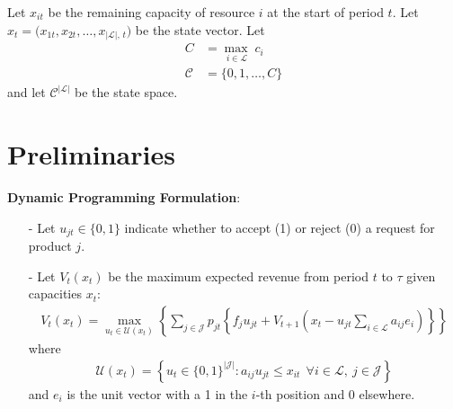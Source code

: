 \documentclass[11pt]{article}
\begin{document}
\noindent
Let $x_{it}$ be the remaining capacity of resource $i$ at the start of period $t$. 
Let $x_t = \bigl(x_{1t}, x_{2t}, \dots, x_{|\mathcal L|,\,t}\bigr)$ be the state vector. 
Let
\begin{align*}
    C &= \max_{\,i\in\mathcal L}\;c_i \\
    \mathcal{C} &= \{0, 1, \ldots, C\} 
\end{align*}
and let $\mathcal{C}^{|\mathcal{L}|}$ be the state space.


\newpage

\section{Preliminaries}

\noindent
\textbf{Dynamic Programming Formulation}:
\begin{itemize}[itemsep=0pt,parsep=0pt]
\item[-] Let $u_{jt}\in\{0,1\}$ indicate whether to accept (1) or reject (0) a request for product $j$.
\item[-] Let $V_t(x_t)$ be the maximum expected revenue from period $t$ to $\tau$ given capacities $x_t$:
    \begin{align*}
        V_t(x_t) = \max_{u_t \in \mathcal{U}(x_t)} 
            \left\{ \sum_{j\in \mathcal{J}} p_{jt} 
            \left\{ 
                f_j u_{jt} + 
                V_{t+1} \left(x_t - u_{jt}\sum_{i\in \mathcal{L}}a_{ij}e_i\right) 
            \right\} \right\} 
        \tag{DP1}
    \end{align*}
    where
    \begin{align*}
        \mathcal{U}(x_t) = \left\{ 
            u_{t} \in \{0,1\}^{|\mathcal{J}|} : 
            a_{ij} u_{jt} \le x_{it} \ \ 
            \forall i \in \mathcal{L}, \ j \in \mathcal{J}
        \right\} 
    \end{align*}
    and $e_i$ is the unit vector with a 1 in the $i$-th position and 0 elsewhere.
\end{itemize}

\vspace{0.5cm}
\end{document}
